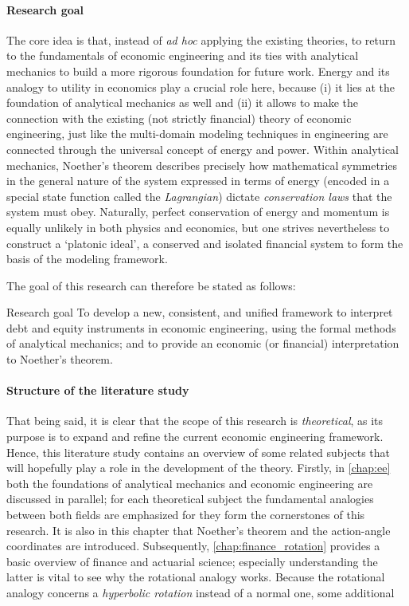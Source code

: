 \paragraph{Research goal} The core idea is that, instead of \emph{ad hoc} applying the existing theories, to return to the fundamentals of economic engineering and its ties with analytical mechanics to build a more rigorous foundation for future work. Energy and its analogy to utility in economics play a crucial role here, because (i) it lies at the foundation of analytical mechanics as well and (ii) it allows to make the connection with the existing (not strictly financial) theory of economic engineering, just like the multi-domain modeling techniques in engineering are connected through the universal concept of energy and power. Within analytical mechanics, Noether's theorem describes precisely how mathematical symmetries in the general nature of the system expressed in terms of energy (encoded in a special state function called the \emph{Lagrangian}) dictate \emph{conservation laws} that the system must obey. Naturally, perfect conservation of energy and momentum is equally unlikely in both physics and economics, but one strives nevertheless to construct a `platonic ideal', a conserved and isolated financial system to form the basis of the modeling framework.

The goal of this research can therefore be stated as follows: 
\begin{block}{Research goal}
    To develop a new, consistent, and unified framework to interpret debt and equity instruments in economic engineering, using the formal methods of analytical mechanics; and to provide an economic (or financial) interpretation to Noether's theorem.
\end{block}
\paragraph{Structure of the literature study} That being said, it is clear that the scope of this research is \emph{theoretical}, as its purpose is to expand and refine the current economic engineering framework. Hence, this literature study contains an overview of some related subjects that will hopefully play a role in the development of the theory. Firstly, in \cref{chap:ee} both the foundations of analytical mechanics and economic engineering are discussed in parallel; for each theoretical subject the fundamental analogies between both fields are emphasized for they form the cornerstones of this research. It is also in this chapter that Noether's theorem and the action-angle coordinates are introduced. Subsequently, \cref{chap:finance_rotation} provides a basic overview of finance and actuarial science; especially understanding the latter is vital to see why the rotational analogy works. Because the rotational analogy concerns a \emph{hyperbolic rotation} instead of a normal one, some additional 



